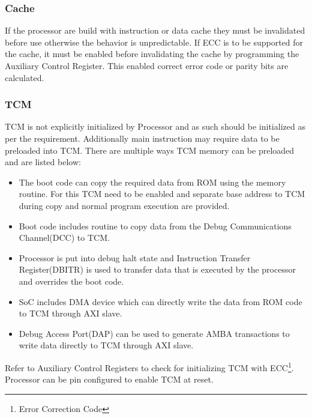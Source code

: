\subsubsection{Cache}
If the processor are build with instruction or data cache they must be invalidated before use otherwise the behavior is unpredictable.
If ECC is to be supported for the cache, it must be enabled before invalidating the cache by programming the Auxiliary Control Register. This enabled correct error code or parity bits are calculated.

\subsubsection{TCM}
TCM is not explicitly initialized by Processor and as such should be initialized as per the requirement.
Additionally main instruction may require data to be preloaded into TCM. There are multiple ways TCM memory can be preloaded and are listed below:
\begin{itemize}
	\item The boot code can copy the required data from ROM using the memory routine. For this TCM need to be enabled and separate base address to TCM during copy and normal program execution are provided.
	\item Boot code includes routine to copy data from the Debug Communications Channel(DCC) to TCM.
	\item Processor is put into debug halt state and Instruction Transfer Register(DBITR) is used to transfer data that is executed by the processor and overrides the boot code.
	\item SoC includes DMA device which can directly write the data from ROM code to TCM through AXI slave.
	\item Debug Access Port(DAP) can be used to generate AMBA transactions to write data directly to TCM through AXI slave.
\end{itemize}
Refer to Auxiliary Control Registers to check for initializing TCM with ECC\footnote{Error Correction Code}.
Processor can be pin configured to enable TCM at reset.


